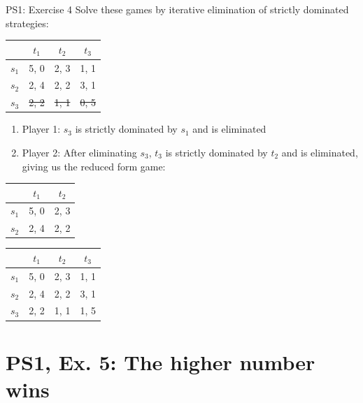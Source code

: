 \begin{frame}{PS1: Exercise 4}
Solve these games by iterative elimination of strictly dominated strategies:
\begin{multicols}{2}
\begin{table}
  \begin{tabular}{c|c|c|c}
          & $t_1$ & $t_2$ & $t_3$ \\
    \midrule
    $s_1$ & 5, 0  & 2, 3  & 1, 1 \\
    \midrule
    $s_2$ & 2, 4  & 2, 2  & 3, 1 \\
    \midrule
    \sout{$s_3$} & \sout{2, 2}  & \sout{1, 1}  & \sout{0, 5}
  \end{tabular}
\end{table}
\begin{enumerate}
  \item Player 1: $s_3$ is strictly dominated by $s_1$ and is eliminated
  \item Player 2: After eliminating $s_3$, $t_3$ is strictly dominated by $t_2$ and is eliminated, giving us the reduced form game:
\end{enumerate}
\begin{table}
  \begin{tabular}{c|c|c}
          & $t_1$ & $t_2$ \\
    \midrule
    $s_1$ & 5, 0  & 2, 3  \\
    \midrule
    $s_2$ & 2, 4  & 2, 2  \\
  \end{tabular}
\end{table}
\vfill\null
\columnbreak
\begin{table}
  \begin{tabular}{c|c|c|c}
          & $t_1$ & $t_2$ & $t_3$ \\
    \midrule
    $s_1$ & 5, 0  & 2, 3  & 1, 1 \\
    \midrule
    $s_2$ & 2, 4  & 2, 2  & 3, 1 \\
    \midrule
    $s_3$ & 2, 2  & 1, 1  & 1, 5
  \end{tabular}
\end{table}
\vfill\null
\end{multicols}
\end{frame}


\section{PS1, Ex. 5: The higher number wins}

